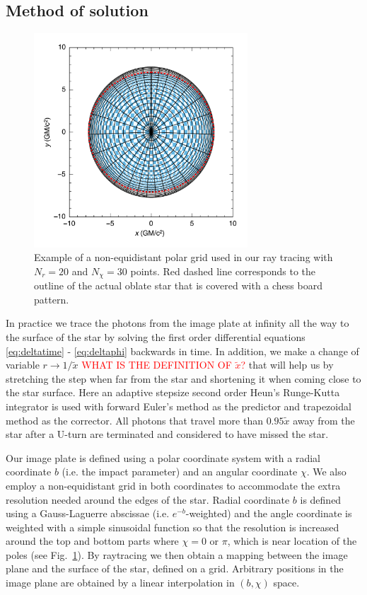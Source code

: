 \documentclass[iop, usenatbib]{emulateapj}
\newcommand{\red}[1]{\textcolor{red}{#1}}
\begin{document}
\subsection{Method of solution}\label{sect:num_methods}


\begin{figure}
\centering
\includegraphics[width=8cm]{figs/fig6a.pdf}
\caption{\label{fig:grid}
Example of a non-equidistant polar grid used in our ray tracing with $N_r = 20$ and $N_{\chi} = 30$ points.
Red dashed line corresponds to the outline of the actual oblate star that is covered with a chess board pattern.
}
\end{figure}

In practice we trace the photons from the image plate at infinity all
the way to the surface of the star by solving the first order
differential equations \eqref{eq:deltatime} - \eqref{eq:deltaphi}
backwards in time.  In addition, we make a change of variable $r
\rightarrow 1/\tilde{x}$ \red{WHAT IS THE DEFINITION OF $\tilde{x}$?} that will help us by stretching the step when
far from the star and shortening it when coming close to the star
surface.  Here an adaptive stepsize second order Heun's Runge-Kutta
integrator is used with forward Euler's method as
the predictor and trapezoidal method as the corrector.  
All photons that travel
more than $0.95\tilde{x}$ away from the star after a U-turn are
terminated and considered to have missed the star.

Our image plate is defined using a polar coordinate system with a radial
coordinate $b$ (i.e. the impact parameter) and an angular coordinate $\chi$.
We also employ a non-equidistant grid in both coordinates to accommodate
the extra resolution needed around the edges of the star.  Radial
coordinate $b$ is defined using a Gauss-Laguerre abscissae (i.e.
$e^{-b}$-weighted) and the angle coordinate is weighted with a simple
sinusoidal function so that the resolution is increased around the top
and bottom parts where $\chi = 0$ or $\pi$, which is near location of the poles
(see Fig.~\ref{fig:grid}).  By raytracing we then obtain
a mapping between the image plane and the surface of the star, defined
on a grid.
Arbitrary positions in the image plane are 
obtained by a linear interpolation in $(b, \chi)$ space.
\end{document}
